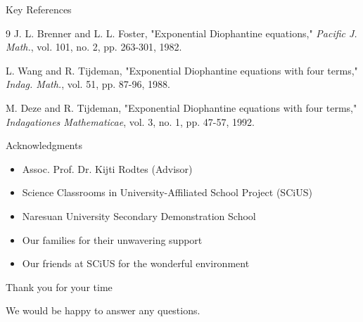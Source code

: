     

\begin{frame}{Key References}
    \begin{thebibliography}{9}
         J. L. Brenner and L. L. Foster, "Exponential Diophantine equations," \textit{Pacific J. Math.}, vol. 101, no. 2, pp. 263-301, 1982.
        
         L. Wang and R. Tijdeman, "Exponential Diophantine equations with four terms," \textit{Indag. Math.}, vol. 51, pp. 87-96, 1988.
        
         M. Deze and R. Tijdeman, "Exponential Diophantine equations with four terms," \textit{Indagationes Mathematicae}, vol. 3, no. 1, pp. 47-57, 1992.
    \end{thebibliography}
\end{frame}

\begin{frame}{Acknowledgments}
    \Large
    \centering
    \begin{itemize}
        \item Assoc. Prof. Dr. Kijti Rodtes (Advisor)
        \item Science Classrooms in University-Affiliated School Project (SCiUS)
        \item Naresuan University Secondary Demonstration School
        \item Our families for their unwavering support
        \item Our friends at SCiUS for the wonderful environment
    \end{itemize}
\end{frame}

\begin{frame}
    \Huge
    \centering
    Thank you for your time
    
    \vspace{1cm}
    \Large
    We would be happy to answer any questions.
\end{frame}


